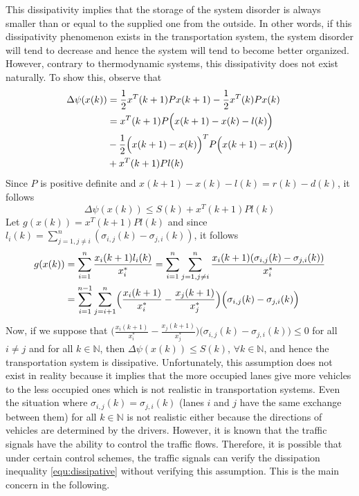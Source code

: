 \documentclass[trsc,nonblindrev]{informs3} %
\renewcommand{\vec}[1]{#1}
\newcommand{\mat}[1]{#1}
\begin{document}
This dissipativity implies that the storage of the system disorder is
always smaller than or equal to the supplied one from the outside. In
other words, if this dissipativity phenomenon exists in the
transportation system, the system disorder will tend to decrease and
hence the system will tend to become better organized. 
However, contrary to thermodynamic systems, this dissipativity does not exist naturally. To show this, 
observe that 
\begin{align*}
\Delta\psi(\vec{x}(k))
&=\frac{1}{2}\vec{x}^T(k+1)\mat{P}\vec{x}(k+1)
-\frac{1}{2}\vec{x}^T(k)\mat{P}\vec{x}(k)\\
&=\vec{x}^T(k+1)\mat{P}
\Bigl(\vec{x}(k+1)-\vec{x}(k)-\vec{l}(k)\Bigr)\\
&-\frac{1}{2}\Bigl(\vec{x}(k+1)-\vec{x}(k)\Bigr)^T
\mat{P}\Bigl(\vec{x}(k+1)-\vec{x}(k)\Bigr)\\
&+\vec{x}^T(k+1)\mat{P}\vec{l}(k)\\
\end{align*}
Since $\mat{P}$ is positive definite and
$\vec{x}(k+1)-\vec{x}(k)-\vec{l}(k)=\vec{r}(k)-\vec{d}(k)$, it follows
\begin{equation}\label{equ:dissipative1}
\Delta\psi(\vec{x}(k))\leq S(k)+\vec{x}^T(k+1)\mat{P}\vec{l}(k)
\end{equation}
Let $g(\vec{x}(k))=\vec{x}^T(k+1)P\vec{l}(k)$ and since
$l_i(k)=\sum_{j=1,j\neq i}^{n}(\sigma_{i,j}(k)-\sigma_{j,i}(k))$, it
follows
\begin{align}\label{eq:g}
g(\vec{x}(k))&=\sum_{i=1}^{n}
\frac{x_i(k+1)l_i(k)}{x_i^*}=
\sum_{i=1}^{n}\sum_{j=1,j\neq i}^{n}
\frac{x_i(k+1)(\sigma_{i,j}(k)-\sigma_{j,i}(k))}{x_i^*}
\nonumber\\
&=\sum_{i=1}^{n-1}\sum_{j=i+1}^{n}
\Bigl(\frac{x_i(k+1)}{x_i^*}-\frac{x_j(k+1)}{x_j^*}\Bigr)
\Bigl(\sigma_{i,j}(k)-\sigma_{j,i}(k)\Bigl)\nonumber\\
 \end{align}
Now, if we suppose that
$\bigl(\frac{x_i(k+1)}{x_i^*}-\frac{x_j(k+1)}{x_j^*}\bigr)
\bigl(\sigma_{i,j}(k)-\sigma_{j,i}(k)\bigl)\le 0$ for all $i\neq j$
and for all $k\in\mathbb{N}$,
then $\Delta\psi(\vec{x}(k)) \leq S(k)$, $\forall k\in\mathbb{N}$, and
hence the transportation system is dissipative. Unfortunately, this 
assumption does not exist in reality because it implies that the more
occupied lanes give  more vehicles to the less occupied ones which is
not realistic in transportation systems. Even the situation where
$\sigma_{i,j}(k)=\sigma_{j,i}(k)$ (lanes $i$ and $j$ have the same  
exchange between them) for all $k\in\mathbb{N}$ is not realistic
either because the directions of vehicles are determined by the
drivers. However, it is known that the traffic signals have the
ability to control the traffic flows.
Therefore, it is possible that under certain control schemes, the
traffic signals can verify the dissipation inequality
\eqref{equ:dissipative} without verifying this assumption. This is the
main concern in the following.
\end{document}

